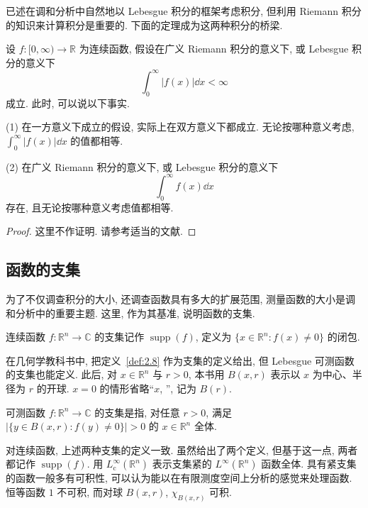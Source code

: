 已述在调和分析中自然地以 Lebesgue 积分的框架考虑积分, 但利用 Riemann 积分的知识来计算积分是重要的. 下面的定理成为这两种积分的桥梁.

\begin{theorem}\label{thm:2.9}
设 $f: [0, \infty) \to \mathbb{R}$ 为连续函数, 假设在广义 Riemann 积分的意义下, 或 Lebesgue 积分的意义下
\[
\int_{0}^{\infty}|f(x)|\dd x < \infty
\]
成立. 此时, 可以说以下事实.

(1) 在一方意义下成立的假设, 实际上在双方意义下都成立. 无论按哪种意义考虑, $\int_{0}^{\infty}|f(x)|\dd x$ 的值都相等.

(2) 在广义 Riemann 积分的意义下, 或 Lebesgue 积分的意义下
\[
\int_{0}^{\infty}f(x)\dd x
\]
存在, 且无论按哪种意义考虑值都相等.
\end{theorem}

\begin{proof}
这里不作证明. 请参考适当的文献.
\end{proof}

\subsection*{函数的支集}

为了不仅调查积分的大小, 还调查函数具有多大的扩展范围, 测量函数的大小是调和分析中的重要主题. 这里, 作为其基准, 说明函数的支集.

\begin{definition}[连续函数的支集]\label{def:2.8}
连续函数 $f: \mathbb{R}^{n} \to \mathbb{C}$ 的支集记作 $\operatorname{supp}(f)$, 定义为 $\{x \in \mathbb{R}^{n} : f(x) \neq 0\}$ 的闭包.
\end{definition}

在几何学教科书中, 把定义~\ref{def:2.8} 作为支集的定义给出, 但 Lebesgue 可测函数的支集也能定义. 此后, 对 $x \in \mathbb{R}^{n}$ 与 $r > 0$, 本书用 $B(x, r)$ 表示以 $x$ 为中心、半径为 $r$ 的开球. $x = 0$ 的情形省略``$x$, '', 记为 $B(r)$.

\begin{definition}[可测函数的支集]\label{def:2.9}
可测函数 $f: \mathbb{R}^{n} \to \mathbb{C}$ 的支集是指, 对任意 $r > 0$, 满足 $|\{y \in B(x, r) : f(y) \neq 0\}| > 0$ 的 $x \in \mathbb{R}^{n}$ 全体.
\end{definition}

对连续函数, 上述两种支集的定义一致. 虽然给出了两个定义, 但基于这一点, 两者都记作 $\operatorname{supp}(f)$. 用 $L_{\mathrm{c}}^{\infty}(\mathbb{R}^{n})$ 表示支集紧的 $L^{\infty}(\mathbb{R}^{n})$ 函数全体. 具有紧支集的函数一般多有可积性, 可以认为能以在有限测度空间上分析的感觉来处理函数. 恒等函数 $1$ 不可积, 而对球 $B(x, r)$, $\chi_{B(x, r)}$ 可积.
